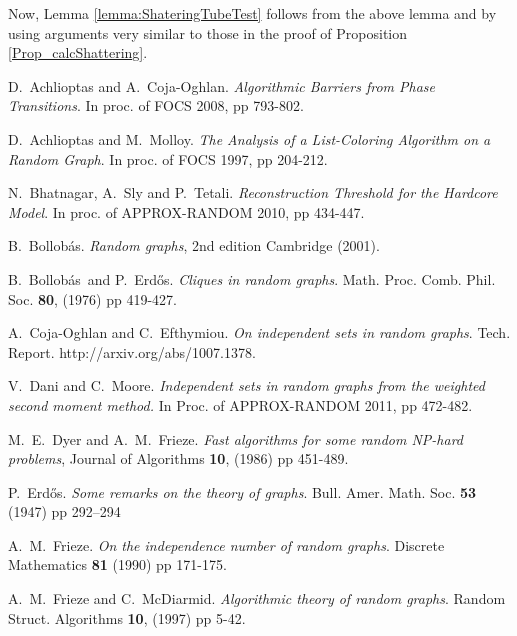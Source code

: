 \documentclass[a4paper,10pt]{article}
\newcommand{\Erdos}{Erd\H{o}s}
\newcommand{\Bollobas}{Bollob\'as}
\begin{document}
\noindent
Now,  Lemma \ref{lemma:ShateringTubeTest} follows from the above lemma and
by using arguments very similar to those in the proof of Proposition \ref{Prop_calcShattering}.




\begin{thebibliography}{00}


D.~Achlioptas and A.~Coja-Oghlan. 
{\em Algorithmic Barriers from Phase Transitions}.  
In proc. of FOCS 2008, pp 793-802.



 D.~Achlioptas and M.~Molloy. 
{\em The Analysis of a List-Coloring Algorithm on a Random Graph}. 
In proc. of FOCS 1997, pp 204-212.



 N.~Bhatnagar, A.~Sly and P.~Tetali. 
{\em Reconstruction Threshold for the Hardcore Model}. 
In proc. of APPROX-RANDOM 2010, pp 434-447.



 B.~\Bollobas. 
{\em Random graphs},
2nd edition Cambridge (2001).



 B.~\Bollobas~and P.~\Erdos. 
{\em Cliques in random graphs}.
Math. Proc. Comb. Phil. Soc. \textbf{80}, (1976) pp 419-427.


 A.~Coja-Oghlan and C.~Efthymiou.
{\em On independent sets in random graphs}. Tech. Report.
http://arxiv.org/abs/1007.1378.

 V.~Dani and C.~Moore. {\em Independent sets in
random graphs from the weighted second moment method.} 
In Proc. of APPROX-RANDOM 2011, pp 472-482.


 M.~E.~Dyer and A.~M.~Frieze. 
{\em Fast algorithms for some random NP-hard problems}, 
Journal of Algorithms \textbf{10}, (1986) pp 451-489.



 P.~\Erdos. 
{\em Some remarks on the theory of graphs}. 
Bull. Amer. Math. Soc. \textbf{53} (1947) pp 292--294



 A.~M.~Frieze. 
{\em  On the independence number of random graphs}. 
Discrete Mathematics \textbf{81} (1990) pp 171-175.



 A.~M.~Frieze and C.~McDiarmid.
{\em Algorithmic theory of random graphs}. 
Random Struct. Algorithms \textbf{10}, (1997) pp 5-42.




\end{thebibliography}
\end{document}
